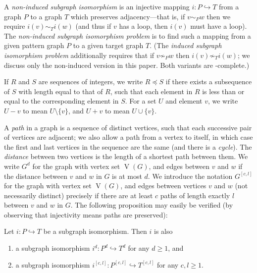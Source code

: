 \documentclass{llncs}
\begin{document}
A \emph{non-induced subgraph isomorphism} is an injective mapping $i : P \hookrightarrow T$ from a
graph $P$ to a graph $T$ which preserves adjacency---that is, if $v \sim_{P} w$ then we require
$i(v) \sim_{T} i(w)$ (and thus if $v$ has a loop, then $i(v)$ must have a loop). The
\emph{non-induced subgraph isomorphism problem} is to find such a mapping from a given pattern graph
$P$ to a given target graph $T$.  (The \emph{induced subgraph isomorphism problem} additionally
requires that if $v \not\sim_{P} w$ then $i(v) \not\sim_{T} i(w)$; we discuss only the non-induced
version in this paper. Both variants are \NP-complete.)

If $R$ and $S$ are sequences of integers, we write $R \preceq S$ if there exists a subsequence of
$S$ with length equal to that of $R$, such that each element in $R$ is less than or equal to the
corresponding element in $S$.  For a set $U$ and element $v$, we write $U - v$ to mean $U \setminus
\{ v \}$, and $U + v$ to mean $U \cup \{ v \}$.

A \emph{path} in a graph is a sequence of distinct vertices, such that each successive pair of
vertices are adjacent; we also allow a path from a vertex to itself, in which case the first and
last vertices in the sequence are the same (and there is a \emph{cycle}). The \emph{distance}
between two vertices is the length of a shortest path between them. We write $G^d$ for the graph
with vertex set $\operatorname{V}(G)$, and edges between $v$ and $w$ if the distance between $v$ and
$w$ in $G$ is at most $d$.  We introduce the notation $G^{\left[c, l\right]}$ for the graph with
vertex set $\operatorname{V}(G)$, and edges between vertices $v$ and $w$ (not necessarily distinct)
precisely if there are at least $c$ paths of length exactly $l$ between $v$ and $w$ in $G$. The
following proposition may easily be verified (by observing that injectivity means paths are
preserved):

\begin{proposition}\label{proposition:supplemental}
    Let $i : P \hookrightarrow T$ be a subgraph isomorphism. Then $i$ is also
    \begin{enumerate}[itemindent=1em,topsep=2pt,itemsep=0.2pt]
        \item a subgraph isomorphism $i^d : P^d \hookrightarrow T^d$ for any $d \ge 1$, and
        \item a subgraph isomorphism $i^{\left[c, l\right]} : P^{\left[c, l\right]} \hookrightarrow
            T^{\left[c, l\right]}$ for any $c, l \ge 1$.
    \end{enumerate}
\end{proposition}
\end{document}
